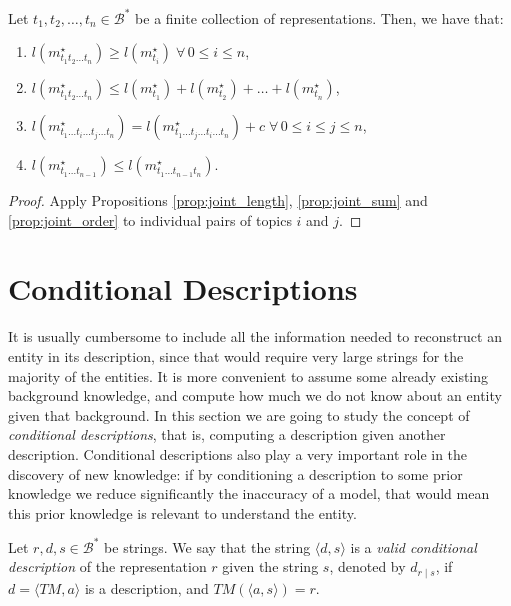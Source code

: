 \begin{proposition}
\label{prop:joint_multiple_topics}
Let $t_1, t_2, \ldots, t_n \in \mathcal{B}^\ast$ be a finite collection of representations. Then, we have that:

\renewcommand{\theenumi}{\roman{enumi}}
\begin{enumerate}
\item $l(m_{t_1 t_2 \ldots t_n}^\star) \geq l(m_ {t_i}^\star) \; \forall \, 0 \leq i \leq n$,
\item $l(m_{t_1 t_2 \ldots t_n}^\star) \leq l(m_ {t_1}^\star) + l(m_ {t_2}^\star) + \ldots + l(m_ {t_n}^\star)$,
\item $l(m_{t_1 \ldots t_i \ldots t_j \ldots t_n}^\star) = l(m_{t_1 \ldots t_j \ldots t_i \ldots t_n}^\star) + c \; \forall \, 0 \leq i \leq j \leq n$,
\item $l(m_{t_1 \ldots t_{n-1}}^\star) \leq l(m_{t_1 \ldots t_{n-1} t_n}^\star)$.
\end{enumerate}
\end{proposition}
\begin{proof}
Apply Propositions \ref{prop:joint_length}, \ref{prop:joint_sum} and \ref{prop:joint_order} to individual pairs of topics $i$ and $j$.
\end{proof}

%
%

\section{Conditional Descriptions}

It is usually cumbersome to include all the information needed to reconstruct an entity in its description, since that would require very large strings for the majority of the entities. It is more convenient to assume some already existing background knowledge, and compute how much we do not know about an entity given that background. In this section we are going to study the concept of \emph{conditional descriptions}, that is, computing a description given another description. Conditional descriptions also play a very important role in the discovery of new knowledge: if by conditioning a description to some prior knowledge we reduce significantly the inaccuracy of a model, that would mean this prior knowledge is relevant to understand the entity.

\begin{definition}
\label{def:conditional_description}
Let $r, d, s \in \mathcal{B}^\ast$ be strings. We say that the string $\langle d, s \rangle$ is a \emph{valid conditional description} of the representation $r$ given the string $s$, denoted by $d_{r \mid s}$, if $d = \langle TM, a \rangle$ is a description, and $TM \left(\langle a, s \rangle \right) = r$.
\end{definition}

